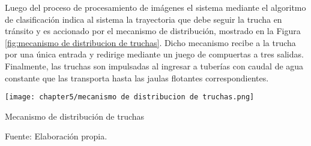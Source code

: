 Luego del proceso de procesamiento de imágenes el sistema mediante el algoritmo de clasificación indica al sistema la trayectoria que debe seguir la trucha en tránsito y es accionado por el mecanismo de distribución, mostrado en la Figura \ref{fig:mecanismo de distribucion de truchas}. Dicho mecanismo recibe a la trucha por una única entrada y redirige mediante un juego de compuertas a tres salidas. Finalmente, las truchas son impulsadas al ingresar a tuberías con caudal de agua constante que las transporta hasta las jaulas flotantes correspondientes.

\begin{myfigure}[H]
	\centering
	\texttt{[image: chapter5/mecanismo de distribucion de truchas.png]}
	\caption{Mecanismo de distribución de truchas}
	\begin{myflushleftportland}
		Fuente: Elaboración propia.
	\end{myflushleftportland}
	\label{fig:mecanismo de distribucion de truchas}
\end{myfigure}

